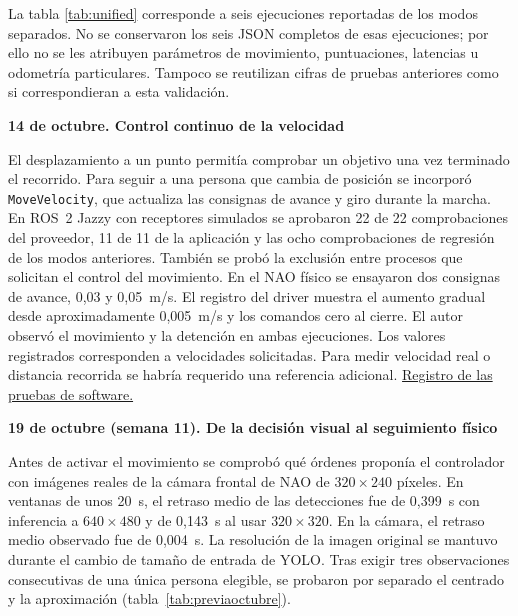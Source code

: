 \documentclass[11pt,letterpaper]{article}
\newcommand{\code}[1]{\nolinkurl{#1}}
\begin{document}
La tabla \ref{tab:unified} corresponde a seis ejecuciones reportadas de los modos separados. No se conservaron los seis JSON completos de esas ejecuciones; por ello no se les atribuyen parámetros de movimiento, puntuaciones, latencias u odometría particulares. Tampoco se reutilizan cifras de pruebas anteriores como si correspondieran a esta validación.

\FloatBarrier

\par\medskip\noindent\textbf{14 de octubre. Control continuo de la velocidad}\par

El desplazamiento a un punto permitía comprobar un objetivo una vez terminado el recorrido. Para seguir a una persona que cambia de posición se incorporó \code{MoveVelocity}, que actualiza las consignas de avance y giro durante la marcha. En ROS~2 Jazzy con receptores simulados se aprobaron 22 de 22 comprobaciones del proveedor, 11 de 11 de la aplicación y las ocho comprobaciones de regresión de los modos anteriores. También se probó la exclusión entre procesos que solicitan el control del movimiento. En el NAO físico se ensayaron dos consignas de avance, 0,03 y 0,05~m/s. El registro del driver muestra el aumento gradual desde aproximadamente 0,005~m/s y los comandos cero al cierre. El autor observó el movimiento y la detención en ambas ejecuciones. Los valores registrados corresponden a velocidades solicitadas. Para medir velocidad real o distancia recorrida se habría requerido una referencia adicional. \href{https://github.com/jumafe1/portable-hri-reference-system/tree/654b7cf556d7a672f81b1182937e370010b5d832/results/move_velocity_software_20261014}{Registro de las pruebas de software.}

\par\medskip\noindent\textbf{19 de octubre (semana 11). De la decisión visual al seguimiento físico}\par

Antes de activar el movimiento se comprobó qué órdenes proponía el controlador con imágenes reales de la cámara frontal de NAO de $320\times240$ píxeles. En ventanas de unos 20~s, el retraso medio de las detecciones fue de 0,399~s con inferencia a $640\times480$ y de 0,143~s al usar $320\times320$. En la cámara, el retraso medio observado fue de 0,004~s. La resolución de la imagen original se mantuvo durante el cambio de tamaño de entrada de YOLO. Tras exigir tres observaciones consecutivas de una única persona elegible, se probaron por separado el centrado y la aproximación (tabla~\ref{tab:previaoctubre}).
\end{document}
